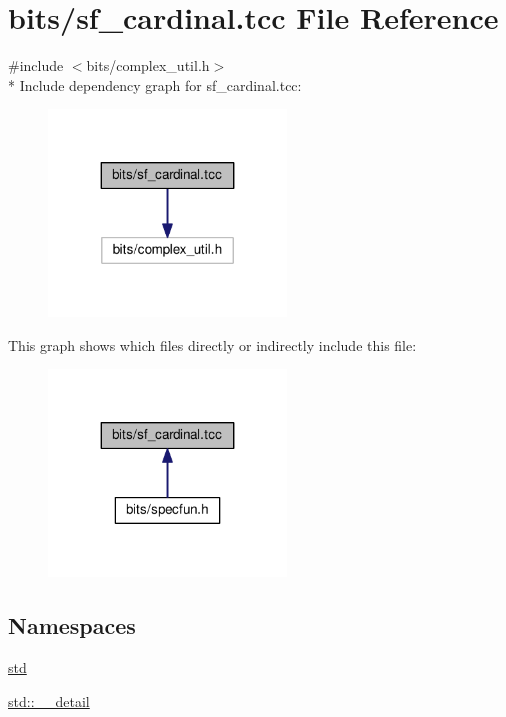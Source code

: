 \hypertarget{sf__cardinal_8tcc}{}\section{bits/sf\+\_\+cardinal.tcc File Reference}
\label{sf__cardinal_8tcc}
{\ttfamily \#include $<$bits/complex\+\_\+util.\+h$>$}\\*
Include dependency graph for sf\+\_\+cardinal.\+tcc\+:
\nopagebreak
\begin{figure}[H]
\begin{center}
\leavevmode
\includegraphics[width=179pt]{sf__cardinal_8tcc__incl}
\end{center}
\end{figure}
This graph shows which files directly or indirectly include this file\+:
\nopagebreak
\begin{figure}[H]
\begin{center}
\leavevmode
\includegraphics[width=179pt]{sf__cardinal_8tcc__dep__incl}
\end{center}
\end{figure}
\subsection*{Namespaces}
\begin{DoxyCompactItemize}
\item 
 \hyperlink{namespacestd}{std}
\item 
 \hyperlink{namespacestd_1_1____detail}{std\+::\+\_\+\+\_\+detail}
\end{DoxyCompactItemize}
